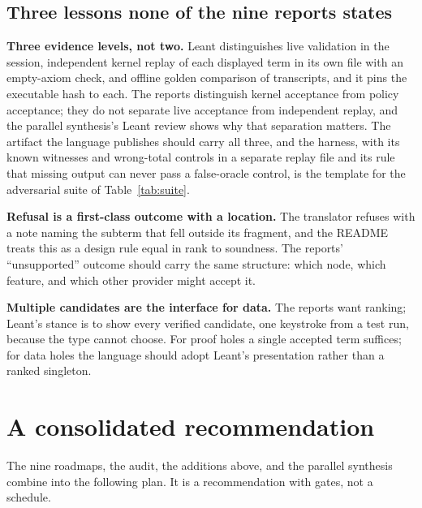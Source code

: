 \documentclass[11pt,a4paper]{article}
\newcommand{\code}[1]{\texttt{\detokenize{#1}}}
\theoremstyle{definition}
\begin{document}
\subsection{Three lessons none of the nine reports states}
\textbf{Three evidence levels, not two.} Leant distinguishes live validation in the session, independent kernel replay of each displayed term in its own file with an empty-axiom check, and offline golden comparison of transcripts, and it pins the executable hash to each. The reports distinguish kernel acceptance from policy acceptance; they do not separate live acceptance from independent replay, and the parallel synthesis's Leant review shows why that separation matters. The artifact the language publishes should carry all three, and the \code{test-church} harness, with its known witnesses and wrong-total controls in a separate replay file and its rule that missing output can never pass a false-oracle control, is the template for the adversarial suite of Table~\ref{tab:suite}.

\textbf{Refusal is a first-class outcome with a location.} The translator refuses with a note naming the subterm that fell outside its fragment, and the README treats this as a design rule equal in rank to soundness. The reports' ``unsupported'' outcome should carry the same structure: which node, which feature, and which other provider might accept it.

\textbf{Multiple candidates are the interface for data.} The reports want ranking; Leant's stance is to show every verified candidate, one keystroke from a test run, because the type cannot choose. For proof holes a single accepted term suffices; for data holes the language should adopt Leant's presentation rather than a ranked singleton.

\section{A consolidated recommendation}
\label{sec:recommendation}
The nine roadmaps, the audit, the additions above, and the parallel synthesis combine into the following plan. It is a recommendation with gates, not a schedule.
\end{document}
